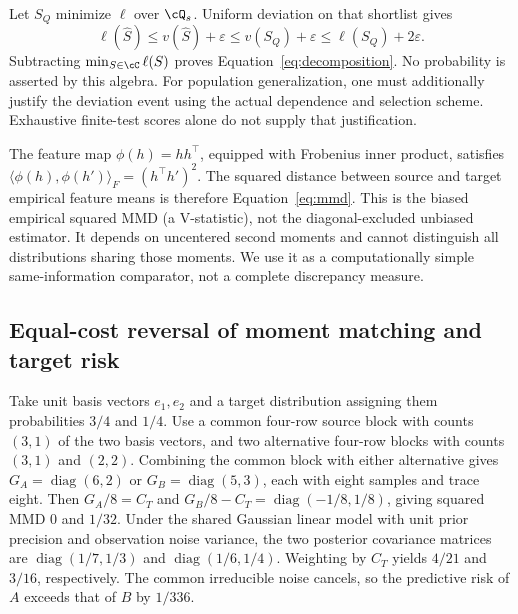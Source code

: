 Let $S_Q$ minimize $\ell$ over $\cQ_s$. Uniform deviation on that shortlist gives
\begin{equation}
 \ell(\widehat S)\leq v(\widehat S)+\varepsilon
 \leq v(S_Q)+\varepsilon\leq\ell(S_Q)+2\varepsilon.
\end{equation}
Subtracting $\min_{S\in\cC}\ell(S)$ proves Equation~\eqref{eq:decomposition}. No probability is asserted by this algebra. For population generalization, one must additionally justify the deviation event using the actual dependence and selection scheme. Exhaustive finite-test scores alone do not supply that justification.

The feature map $\phi(h)=hh^\top$, equipped with Frobenius inner product, satisfies $\langle\phi(h),\phi(h')\rangle_F=(h^\top h')^2$. The squared distance between source and target empirical feature means is therefore Equation~\eqref{eq:mmd}. This is the biased empirical squared MMD (a V-statistic), not the diagonal-excluded unbiased estimator. It depends on uncentered second moments and cannot distinguish all distributions sharing those moments. We use it as a computationally simple same-information comparator, not a complete discrepancy measure.

\subsection{Equal-cost reversal of moment matching and target risk}
\label{app:equal-cost-reversal}
Take unit basis vectors $e_1,e_2$ and a target distribution assigning them probabilities $3/4$ and $1/4$. Use a common four-row source block with counts $(3,1)$ of the two basis vectors, and two alternative four-row blocks with counts $(3,1)$ and $(2,2)$. Combining the common block with either alternative gives $G_A=\operatorname{diag}(6,2)$ or $G_B=\operatorname{diag}(5,3)$, each with eight samples and trace eight. Then $G_A/8=C_T$ and $G_B/8-C_T=\operatorname{diag}(-1/8,1/8)$, giving squared MMD $0$ and $1/32$. Under the shared Gaussian linear model with unit prior precision and observation noise variance, the two posterior covariance matrices are $\operatorname{diag}(1/7,1/3)$ and $\operatorname{diag}(1/6,1/4)$. Weighting by $C_T$ yields $4/21$ and $3/16$, respectively. The common irreducible noise cancels, so the predictive risk of $A$ exceeds that of $B$ by $1/336$.

